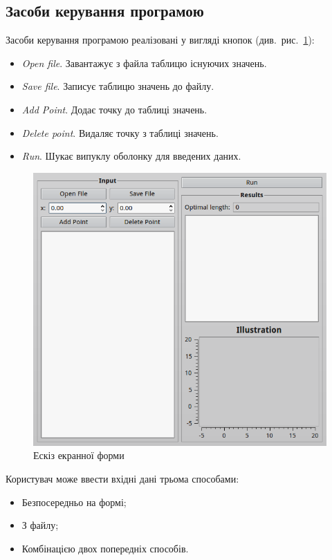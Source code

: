 \documentclass[simple,14pt,utf8,ukrainian]{eskdtext}
\begin{document}
  \subsection{Засоби керування програмою}
    Засоби керування програмою реалізовані у вигляді кнопок
    (див.~рис.~\ref{fig:gui}):
    \begin{itemize}
      \item \emph{Open file}.
        Завантажує з файла таблицю існуючих значень.
      \item \emph{Save file}.
        Записує таблицю значень до файлу.
      \item \emph{Add Point}.
        Додає точку до таблиці значень.
      \item \emph{Delete point}.
        Видаляє точку з таблиці значень.
      \item \emph{Run}.
        Шукає випуклу оболонку для введених даних.
    \end{itemize}

    \begin{figure}[h]
      \centering
      \includegraphics[scale=0.7]{scr.png}
      \caption{Ескіз екранної форми}
      \label{fig:gui}
    \end{figure}

    Користувач може ввести вхідні дані трьома способами:
    \begin{itemize}
      \item Безпосередньо на формі;
      \item З файлу;
      \item Комбінацією двох попередніх способів.
    \end{itemize}
\end{document}
